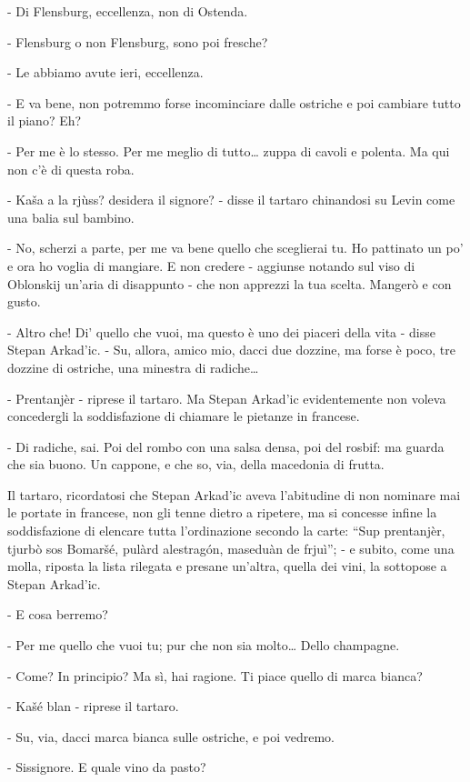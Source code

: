 - Di Flensburg, eccellenza, non di Ostenda. 

- Flensburg o non Flensburg, sono poi fresche? 

- Le abbiamo avute ieri, eccellenza. 

- E va bene, non potremmo forse incominciare dalle ostriche e poi cambiare tutto il piano? Eh? 

- Per me è lo stesso. Per me meglio di tutto\ldots{} zuppa di cavoli e polenta. Ma qui non c'è di questa roba. 

- Kaša a la rjùss? desidera il signore? - disse il tartaro chinandosi su Levin come una balia sul bambino. 

- No, scherzi a parte, per me va bene quello che sceglierai tu. Ho pattinato un po' e ora ho voglia di mangiare. E non credere - aggiunse notando sul viso di Oblonskij un'aria di disappunto - che non apprezzi la tua scelta. Mangerò e con gusto. 

- Altro che! Di' quello che vuoi, ma questo è uno dei piaceri della vita - disse Stepan Arkad'ic. - Su, allora, amico mio, dacci due dozzine, ma forse è poco, tre dozzine di ostriche, una minestra di radiche\ldots{} 

- Prentanjèr - riprese il tartaro. Ma Stepan Arkad'ic evidentemente non voleva concedergli la soddisfazione di chiamare le pietanze in francese. 

- Di radiche, sai. Poi del rombo con una salsa densa, poi del rosbif: ma guarda che sia buono. Un cappone, e che so, via, della macedonia di frutta. 

Il tartaro, ricordatosi che Stepan Arkad'ic aveva l'abitudine di non nominare mai le portate in francese, non gli tenne dietro a ripetere, ma si concesse infine la soddisfazione di elencare tutta l'ordinazione secondo la carte: ``Sup prentanjèr, tjurbò sos Bomaršé, pulàrd alestragón, maseduàn de frjuì''; - e subito, come una molla, riposta la lista rilegata e presane un'altra, quella dei vini, la sottopose a Stepan Arkad'ic. 

- E cosa berremo? 

- Per me quello che vuoi tu; pur che non sia molto\ldots{} Dello champagne. 

- Come? In principio? Ma sì, hai ragione. Ti piace quello di marca bianca? 

- Kašé blan - riprese il tartaro. 

- Su, via, dacci marca bianca sulle ostriche, e poi vedremo. 

- Sissignore. E quale vino da pasto? 

